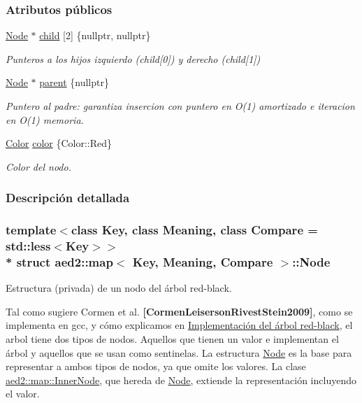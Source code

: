 \subsubsection*{Atributos públicos}
\begin{DoxyCompactItemize}
\item 
\hyperlink{structaed2_1_1map_1_1Node}{Node} $\ast$ \hyperlink{structaed2_1_1map_1_1Node_a7d65c374c73c443a46d8fc224aff9e82_a7d65c374c73c443a46d8fc224aff9e82}{child} \mbox{[}2\mbox{]} \{nullptr, nullptr\}
\begin{DoxyCompactList}\small\item\em Punteros a los hijos izquierdo (child\mbox{[}0\mbox{]}) y derecho (child\mbox{[}1\mbox{]}) \end{DoxyCompactList}\item 
\hyperlink{structaed2_1_1map_1_1Node}{Node} $\ast$ \hyperlink{structaed2_1_1map_1_1Node_ab6a5f9e471b311755e4a56834086cb90_ab6a5f9e471b311755e4a56834086cb90}{parent} \{nullptr\}
\begin{DoxyCompactList}\small\item\em Puntero al padre\+: garantiza insercion con puntero en O(1) amortizado e iteracion en O(1) memoria. \end{DoxyCompactList}\item 
\hyperlink{classaed2_1_1map_a6d62a415a4b9d320b30cada4ebcf9f5b_a6d62a415a4b9d320b30cada4ebcf9f5b}{Color} \hyperlink{structaed2_1_1map_1_1Node_a58dd9993fee8ee3eaa5716b72a3eca47_a58dd9993fee8ee3eaa5716b72a3eca47}{color} \{Color\+::\+Red\}
\begin{DoxyCompactList}\small\item\em Color del nodo. \end{DoxyCompactList}\end{DoxyCompactItemize}


\subsubsection{Descripción detallada}
\subsubsection*{template$<$class Key, class Meaning, class Compare = std\+::less$<$\+Key$>$$>$\\*
struct aed2\+::map$<$ Key, Meaning, Compare $>$\+::\+Node}

Estructura (privada) de un nodo del árbol red-\/black. 

Tal como sugiere Cormen et al. {\bfseries [Cormen\+Leiserson\+Rivest\+Stein2009]}, como se implementa en gcc, y cómo explicamos en \hyperlink{Implementacion}{Implementación del árbol red-\/black}, el arbol tiene dos tipos de nodos. Aquellos que tienen un valor e implementan el árbol y aquellos que se usan como sentinelas. La estructura \hyperlink{structaed2_1_1map_1_1Node}{Node} es la base para representar a ambos tipos de nodos, ya que omite los valores. La clase \hyperlink{structaed2_1_1map_1_1InnerNode}{aed2\+::map\+::\+Inner\+Node}, que hereda de \hyperlink{structaed2_1_1map_1_1Node}{Node}, extiende la representación incluyendo el valor.

